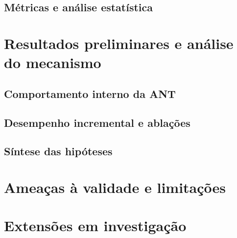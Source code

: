 \subsection{Métricas e análise estatística}

\section{Resultados preliminares e análise do mecanismo}

\subsection{Comportamento interno da ANT}

\subsection{Desempenho incremental e ablações}

\subsection{Síntese das hipóteses}

\section{Ameaças à validade e limitações}

\section{Extensões em investigação}
